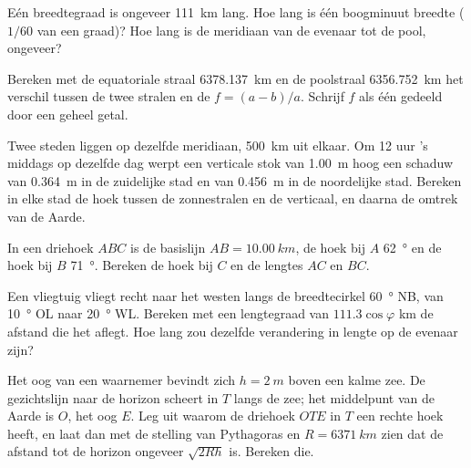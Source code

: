 \begin{exercise}[$\star$]\label{exo:g10:measuring-the-earth:4}
Eén breedtegraad is ongeveer \qty{111}{km} lang. Hoe lang is één boogminuut
breedte ($1/60$ van een graad)? Hoe lang is de meridiaan van de evenaar tot de
pool, ongeveer?
\end{exercise}

\begin{exercise}[$\star$]\label{exo:g10:measuring-the-earth:5}
Bereken met de equatoriale straal \qty{6378.137}{km} en de poolstraal
\qty{6356.752}{km} het verschil tussen de twee stralen en de 
$f = (a-b)/a$. Schrijf $f$ als één gedeeld door een geheel getal.
\end{exercise}

\begin{exercise}[$\star\star$]\label{exo:g10:measuring-the-earth:6}
Twee steden liggen op dezelfde meridiaan, \qty{500}{km} uit elkaar. Om
12 uur 's middags op dezelfde dag werpt een verticale stok van \qty{1.00}{m}
hoog een schaduw van \qty{0.364}{m} in de zuidelijke stad en van
\qty{0.456}{m} in de noordelijke stad. Bereken in elke stad de hoek tussen de
zonnestralen en de verticaal, en daarna de omtrek van de Aarde.
\end{exercise}

\begin{exercise}[$\star\star$]\label{exo:g10:measuring-the-earth:7}
In een driehoek $ABC$ is de basislijn $AB = \qty{10.00}{km}$, de hoek bij $A$
\qty{62}{\degree} en de hoek bij $B$ \qty{71}{\degree}. Bereken de hoek bij $C$
en de lengtes $AC$ en $BC$.
\end{exercise}

\begin{exercise}[$\star\star$]\label{exo:g10:measuring-the-earth:8}
Een vliegtuig vliegt recht naar het westen langs de breedtecirkel
\qty{60}{\degree} NB, van \qty{10}{\degree} OL naar \qty{20}{\degree} WL.
Bereken met een lengtegraad van $111.3 \cos \varphi$ km de afstand die het
aflegt. Hoe lang zou dezelfde verandering in lengte op de evenaar zijn?
\end{exercise}

\begin{exercise}[$\star\star$]\label{exo:g10:measuring-the-earth:9}
Het oog van een waarnemer bevindt zich $h = \qty{2}{m}$ boven een kalme zee. De
gezichtslijn naar de horizon scheert in $T$ langs de zee; het middelpunt van de
Aarde is $O$, het oog $E$. Leg uit waarom de driehoek $OTE$ in $T$ een rechte
hoek heeft, en laat dan met de stelling van Pythagoras en $R = \qty{6371}{km}$
zien dat de afstand tot de horizon ongeveer $\sqrt{2Rh}$ is. Bereken die.
\end{exercise}

